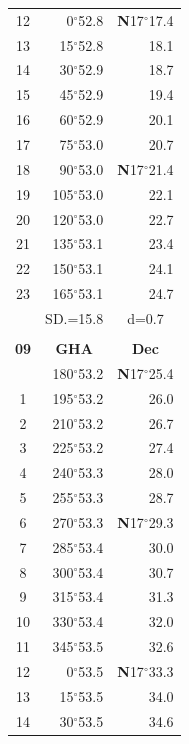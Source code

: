 \documentclass[10pt, a4paper]{report}
\begin{document}
\begin{scriptsize}
\begin{tabular*}{0.2\textwidth}[t]{@{\extracolsep{\fill}}|c|rr|}
12 & 0$^\circ$52.8 & \textbf{N}17$^\circ$17.4\\
13 & 15$^\circ$52.8 & 18.1\\
14 & 30$^\circ$52.9 & 18.7\\
15 & 45$^\circ$52.9 & \raisebox{0.24ex}{\boldmath$\cdot$~\boldmath$\cdot$~~}19.4\\
16 & 60$^\circ$52.9 & 20.1\\
17 & 75$^\circ$53.0 & 20.7\\[2Pt]
18 & 90$^\circ$53.0 & \textbf{N}17$^\circ$21.4\\
19 & 105$^\circ$53.0 & 22.1\\
20 & 120$^\circ$53.0 & 22.7\\
21 & 135$^\circ$53.1 & \raisebox{0.24ex}{\boldmath$\cdot$~\boldmath$\cdot$~~}23.4\\
22 & 150$^\circ$53.1 & 24.1\\
23 & 165$^\circ$53.1 & 24.7\\
\hline
\rule{0pt}{2.4ex} & \multicolumn{1}{c}{SD.=15.8} & \multicolumn{1}{c|}{d=0.7}\\
\hline
\multicolumn{1}{c}{}\\[-0.5ex]\hline
\multicolumn{1}{|c|}{\rule{0pt}{2.6ex}\textbf{09}} & \multicolumn{1}{c}{\textbf{GHA}} & \multicolumn{1}{c|}{\textbf{Dec}}\\
\hline\rule{0pt}{2.6ex}\noindent
0 & 180$^\circ$53.2 & \textbf{N}17$^\circ$25.4\\
1 & 195$^\circ$53.2 & 26.0\\
2 & 210$^\circ$53.2 & 26.7\\
3 & 225$^\circ$53.2 & \raisebox{0.24ex}{\boldmath$\cdot$~\boldmath$\cdot$~~}27.4\\
4 & 240$^\circ$53.3 & 28.0\\
5 & 255$^\circ$53.3 & 28.7\\[2Pt]
6 & 270$^\circ$53.3 & \textbf{N}17$^\circ$29.3\\
7 & 285$^\circ$53.4 & 30.0\\
8 & 300$^\circ$53.4 & 30.7\\
9 & 315$^\circ$53.4 & \raisebox{0.24ex}{\boldmath$\cdot$~\boldmath$\cdot$~~}31.3\\
10 & 330$^\circ$53.4 & 32.0\\
11 & 345$^\circ$53.5 & 32.6\\[2Pt]
12 & 0$^\circ$53.5 & \textbf{N}17$^\circ$33.3\\
13 & 15$^\circ$53.5 & 34.0\\
14 & 30$^\circ$53.5 & 34.6\\

\end{tabular*}
\end{scriptsize}
\end{document}
